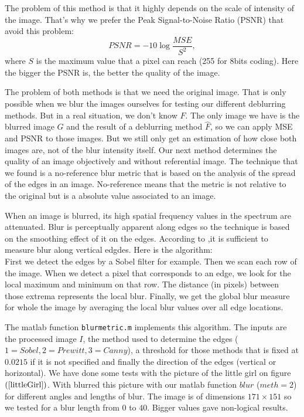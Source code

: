 The problem of this method is that it highly depends on the scale of intensity of the image. That's why we prefer the Peak Signal-to-Noise Ratio (PSNR) that avoid this problem:
\begin{equation}
PSNR = -10 \log \frac{MSE}{S^2},
\end{equation}
where $S$ is the maximum value that a pixel can reach (255 for 8bits coding). Here the bigger the PSNR is, the better the quality of the image.

The problem of both methods is that we need the original image. That is only possible when we blur the images ourselves for testing our different deblurring methods. But in a real situation, we don't know $F$. The only image we have is the blurred image $G$ and the result of a deblurring method $\hat{F}$, so we can apply MSE and PSNR to those images. But we still only get an estimation of how close both images are, not of the blur intensity itself. Our next method determines the quality of an image objectively and without referential image. The technique that we found is a no-reference blur metric that is based on the analysis of the spread of the edges in an image. No-reference means that the metric is not relative to the original but is a absolute value associated to an image.

When an image is blurred, its high spatial frequency values in the spectrum are attenuated. Blur is perceptually apparent along edges so the technique is based on the smoothing effect of it on the edges. According to \cite{marziliano2002no},it is sufficient to measure blur along vertical edgdes. Here is the algorithm:\\
First we detect the edges by a Sobel filter for example. Then we scan each row of the image. When we detect a pixel that corresponds to an edge, we look for the local maximum and minimum on that row. The distance (in pixels) between those extrema represents the local blur. Finally, we get the global blur measure for whole the image by averaging the local blur values over all edge locations.

The matlab function \texttt{blurmetric.m} implements this algorithm. The inputs are the processed image $I$, the method used to determine the edges ($1=Sobel, 2=Prewitt, 3=Canny$), a threshold for those methods that is fixed at $0.0215$ if it is not specified and finally the direction of the edges (vertical or horizontal). We have done some tests with the picture of the little girl on figure $(\ref{littleGirl})$. With blurred this picture with our matlab function $blur$ ($meth=2$) for different angles and lengths of blur. The image is of dimensions $171 \times 151$ so we tested for a blur length from $0$ to $40$. Bigger values gave non-logical results. 

